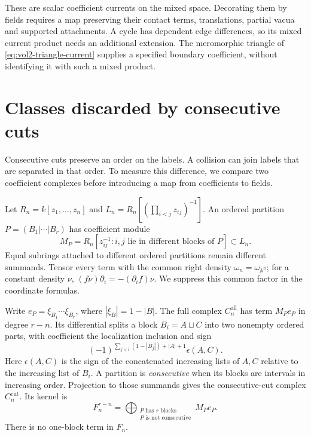 These are scalar coefficient currents on the mixed space.
Decorating them by fields requires a map preserving their
contact terms, translations, partial vacua and supported
attachments. A cycle has dependent edge differences, so its
mixed current product needs an additional extension. The
meromorphic triangle of \eqref{eq:vol2-triangle-current} supplies
a specified boundary coefficient, without identifying it with
such a mixed product.

\section{Classes discarded by consecutive cuts}
\label{sec:vol2-discarded-collisions}

Consecutive cuts preserve an order on the labels. A collision can
join labels that are separated in that order. To measure this
difference, we compare two coefficient complexes before introducing
a map from coefficients to fields.

Let $R_n=k[z_1,\ldots,z_n]$ and
$L_n=R_n[(\prod_{i<j}z_{ij})^{-1}]$.
An ordered partition $P=(B_1|\cdots|B_r)$ has coefficient module
\begin{equation}\label{eq:vol2-partition-coefficient}
 M_P=R_n[z_{ij}^{-1}:i,j\text{ lie in different blocks of }P]
       \subset L_n.
\end{equation}
Equal subrings attached to different ordered partitions remain
different summands. Tensor every term with the common right
density $\omega_n=\omega_{\mathbb A^n}$; for a constant density
$\nu$, $(f\nu)\partial_i=-(\partial_i f)\nu$.
We suppress this common factor in the coordinate formulas.

Write $e_P=\xi_{B_1}\cdots\xi_{B_r}$, where
$|\xi_B|=1-|B|$. The full complex $C_n^{\mathrm{all}}$ has
term $M_Pe_P$ in degree $r-n$. Its differential splits a block
$B_i=A\sqcup C$ into two nonempty ordered parts, with coefficient
the localization inclusion and sign
\begin{equation}\label{eq:vol2-partition-sign}
 (-1)^{\sum_{j<i}(1-|B_j|)+|A|+1}\epsilon(A,C).
\end{equation}
Here $\epsilon(A,C)$ is the sign of the concatenated increasing
lists of $A,C$ relative to the increasing list of $B_i$.
A partition is \emph{consecutive} when its blocks are intervals
in increasing order. Projection to those summands gives the
consecutive-cut complex $C_n^{\mathrm{cut}}$. Its kernel is
\begin{equation}\label{eq:vol2-discarded-complex}
 F_n^{r-n}=\bigoplus_{\substack{P\text{ has }r\text{ blocks}\\
                                  P\text{ is not consecutive}}}M_Pe_P.
\end{equation}
There is no one-block term in $F_n$.

